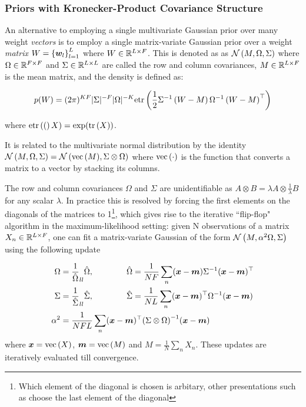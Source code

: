 

\subsubsection{Priors with Kronecker-Product Covariance Structure}
An alternative to employing a single multivariate Gaussian prior over many weight \emph{vectors} is to employ a single matrix-variate Gaussian\cite{Gupta1999} prior over a weight \emph{matrix} $W = \left\{\bm w_l\right\}_{l=1}^L$ where $W \in { \mathbb{R}^{L \times F} }$. This is denoted as as $\mathcal{N} \left(M, \Omega, \Sigma\right)$ where $\Omega \in { \mathbb{R}^{F \times F} }$ and $\Sigma \in { \mathbb{R}^{L \times L} }$ are called the row and column covariances, $M \in { \mathbb{R}^{L \times F} }$ is the mean matrix, and the density is defined as:

\begin{equation}
p(W) = (2\pi)^{KF}|\Sigma|^{-F}|\Omega|^{-K} \text{etr}\left( { \frac{1}{2} {\Sigma}^{-1}\left(W - M\right) {\Omega}^{-1} \left(W - M \right)^\top } \right)
\end{equation}

where $\text{etr}\left( { ( } \right)X) = \exp (\text{tr} \left( {X} \right))$.

It is related to the multivariate normal distribution by the identity $\mathcal{N} \left(M, \Omega, \Sigma\right) = \mathcal{N} \left( {\text{vec}\left(M\right)}, {\Sigma \otimes \Omega} \right)$ where $\text{vec}\left(\cdot\right)$ is the function that converts a matrix to a vector by stacking its columns. 

The row and column covariances $\Omega$ and $\Sigma$ are unidentifiable as $A \otimes B = \lambda A \otimes \frac{1}{\lambda}B$ for any scalar $\lambda$. In practice this is resolved by forcing the first elements on the diagonals of the matrices to 1\footnote{Which element of the diagonal is chosen is arbitary, other presentations such as \cite{Srivastava2009} choose the last element of the diagonal}, which gives rise to the iterative ``flip-flop" algorithm in the maximum-likelihood setting: given N observations of a matrix $X_n \in { \mathbb{R}^{L \times F} }$, one can fit a matrix-variate Gaussian of the form $\mathcal{N} \left(M, \alpha^2 \Omega, \Sigma\right)$ using the following update

\begin{align}
\Omega & = \frac{1}{\hat{\Omega}}_{ll} \hat{\Omega}, \qquad\qquad\hat{\Omega} = \frac{1}{N F} \sum_n (\bm x - \bm m) {\Sigma}^{-1} (\bm x - \bm m)^\top \\
\Sigma & = \frac{1}{\hat{\Sigma}}_{ll} \hat{\Sigma}, \qquad\qquad\hat{\Sigma} = \frac{1}{N L} \sum_n (\bm x - \bm m)^\top {\Omega}^{-1} (\bm x - \bm m) \\
\alpha^2 & = \frac{1}{NFL} \sum_n (\bm x - \bm m)^\top{\left( \Sigma \otimes \Omega \right)}^{-1}(\bm x - \bm m)
\end{align}
where $\bm x = \text{vec}\left(X\right)$, $\bm m = \text{vec}\left(M\right)$ and $M=\frac{1}{N} \sum_n X_n$. These updates are iteratively evaluated till convergence.

